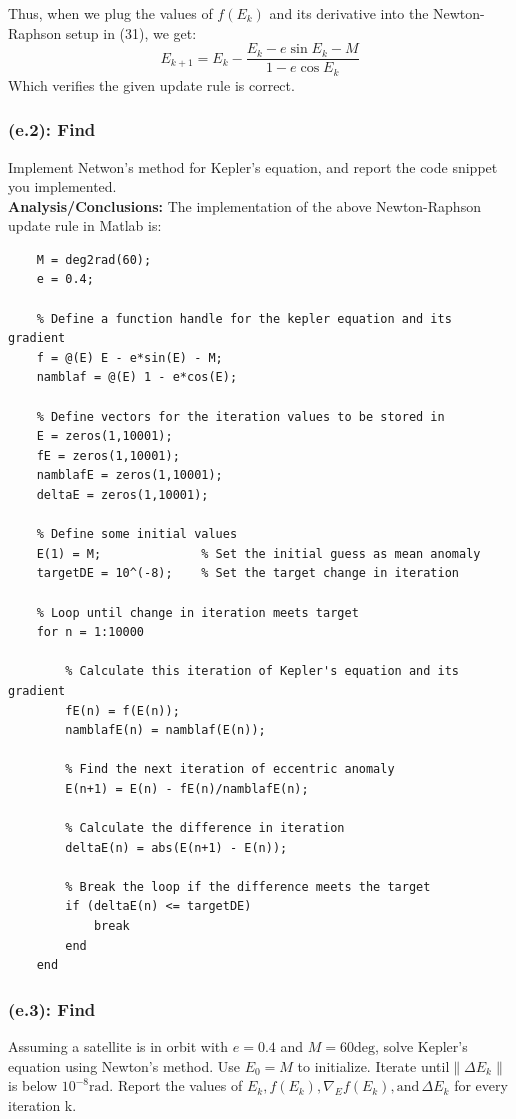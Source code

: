 \documentclass[titlepage]{article}
\begin{document}
\begin{mdframed}[linewidth=1pt, innertopmargin=10pt, innerbottommargin=10pt]
	Thus, when we plug the values of $f(E_k)$ and its derivative into the Newton-Raphson setup in (31), we get:
	\begin{equation}
		E_{k+1}=E_k-\frac{E_k-e\sin E_k-M}{1-e\cos E_k}
	\end{equation}
	Which verifies the given update rule is correct.
\end{mdframed}

\subsubsection*{(e.2): Find}
Implement Netwon's method for Kepler's equation, and report the code snippet you implemented.\\

\textbf{Analysis/Conclusions:}
The implementation of the above Newton-Raphson update rule in Matlab is:
\begin{lstlisting}[label=lst:b.m,caption=Implementation of Newton-Raphson solution to inverting Kepler's Equation.]
	% Define the mean anomaly and eccentricity
	M = deg2rad(60);
	e = 0.4;
	
	% Define a function handle for the kepler equation and its gradient
	f = @(E) E - e*sin(E) - M;
	namblaf = @(E) 1 - e*cos(E);
	
	% Define vectors for the iteration values to be stored in
	E = zeros(1,10001);
	fE = zeros(1,10001);
	namblafE = zeros(1,10001);
	deltaE = zeros(1,10001);
	
	% Define some initial values
	E(1) = M;              % Set the initial guess as mean anomaly
	targetDE = 10^(-8);    % Set the target change in iteration
	
	% Loop until change in iteration meets target
	for n = 1:10000
	
		% Calculate this iteration of Kepler's equation and its gradient
		fE(n) = f(E(n));
		namblafE(n) = namblaf(E(n));
		
		% Find the next iteration of eccentric anomaly
		E(n+1) = E(n) - fE(n)/namblafE(n);
		
		% Calculate the difference in iteration
		deltaE(n) = abs(E(n+1) - E(n));
		
		% Break the loop if the difference meets the target
		if (deltaE(n) <= targetDE)
			break
		end
	end
\end{lstlisting}

\subsubsection*{(e.3): Find}
Assuming a satellite is in orbit with $e=0.4$ and $M=60\text{deg}$, solve Kepler's equation using Newton's method. Use $E_0=M$ to initialize. Iterate until$\|\Delta E_k\|$ is below $10^{-8}\text{rad}$. Report the values of $E_k,f(E_k),\nabla_E f(E_k),\text{and}\,\Delta E_k$ for every iteration k.\\
\end{document}

